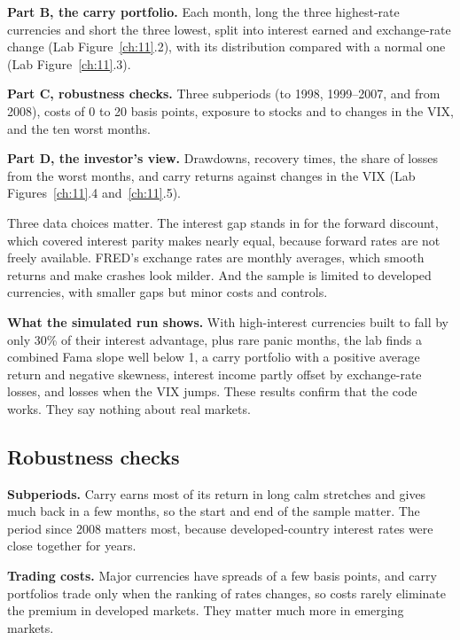 \textbf{Part B, the carry portfolio.} Each month, long the three highest-rate currencies and short the three lowest, split into interest earned and exchange-rate change (Lab Figure~\ref{ch:11}.2), with its distribution compared with a normal one (Lab Figure~\ref{ch:11}.3).

\textbf{Part C, robustness checks.} Three subperiods (to 1998, 1999--2007, and from 2008), costs of 0 to 20 basis points, exposure to stocks and to changes in the VIX, and the ten worst months.

\textbf{Part D, the investor's view.} Drawdowns, recovery times, the share of losses from the worst months, and carry returns against changes in the VIX (Lab Figures~\ref{ch:11}.4 and~\ref{ch:11}.5).

Three data choices matter. The interest gap stands in for the forward discount, which covered interest parity makes nearly equal, because forward rates are not freely available. FRED's exchange rates are monthly averages, which smooth returns and make crashes look milder. And the sample is limited to developed currencies, with smaller gaps but minor costs and controls.

\textbf{What the simulated run shows.} With high-interest currencies built to fall by only 30\% of their interest advantage, plus rare panic months, the lab finds a combined Fama slope well below 1, a carry portfolio with a positive average return and negative skewness, interest income partly offset by exchange-rate losses, and losses when the VIX jumps. These results confirm that the code works. They say nothing about real markets.

\subsection{Robustness checks}
\label{sec:06-stress}

\textbf{Subperiods.} Carry earns most of its return in long calm stretches and gives much back in a few months, so the start and end of the sample matter. The period since 2008 matters most, because developed-country interest rates were close together for years.

\textbf{Trading costs.} Major currencies have spreads of a few basis points, and carry portfolios trade only when the ranking of rates changes, so costs rarely eliminate the premium in developed markets. They matter much more in emerging markets.

